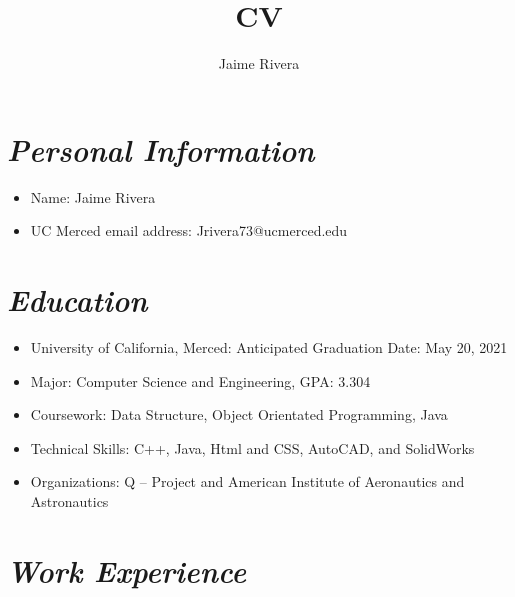 \documentclass[11pt]{article}
\title{CV}
\author{Jaime Rivera}
\begin{document}
\maketitle



\section{ \textit {Personal Information}}

\begin{itemize}
\item Name: Jaime Rivera
\item UC Merced email address: Jrivera73@ucmerced.edu
\end{itemize}


\section{\textit {Education}}

\begin{itemize}
  \item University of California, Merced: Anticipated Graduation Date: May 20, 2021  
  
  \item Major: Computer Science and Engineering, GPA: 3.304 
  
   \item Coursework: Data Structure, Object Orientated Programming, Java
   
    \item Technical Skills: C++, Java, Html and CSS, AutoCAD, and SolidWorks
    
     \item Organizations: Q – Project and American Institute of Aeronautics and Astronautics
  
\end{itemize}





\section{ \textit {Work Experience}}
\end{document}
